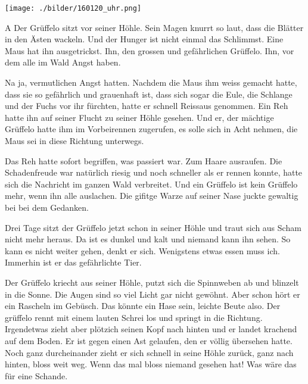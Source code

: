 \thispagestyle{empty}
\begin{center}
\texttt{[image: ./bilder/160120\_uhr.png]}
\end{center}
\vskip 2cm
{\Huge\color{farbe}\hfill{\tt{}}}
\newpage
\lettrine[lines=2, lhang=.2, loversize=.25, lraise=0.05, findent=0.1em,
nindent=0em]{A}{}
Der Grüffelo sitzt vor seiner Höhle. Sein Magen knurrt so laut, dass die Blätter in den Ästen wackeln. Und der Hunger ist nicht einmal das Schlimmst. Eine Maus hat ihn ausgetrickst. Ihn, den grossen und gefährlichen Grüffelo. Ihn, vor dem alle im Wald Angst haben. 

Na ja, vermutlichen Angst hatten. Nachdem die Maus ihm weiss gemacht hatte, dass sie so gefährlich und grauenhaft ist, dass sich sogar die Eule, die Schlange und der Fuchs vor ihr fürchten, hatte er schnell Reissaus genommen. Ein Reh hatte ihn auf seiner Flucht zu seiner Höhle gesehen. Und er, der mächtige Grüffelo hatte ihm im Vorbeirennen zugerufen, es solle sich in Acht nehmen, die Maus sei in diese Richtung unterwegs. 

Das Reh hatte sofort begriffen, was passiert war. Zum Haare ausraufen. Die Schadenfreude war natürlich riesig und noch schneller als er rennen konnte, hatte sich die Nachricht im ganzen Wald verbreitet. Und ein Grüffelo ist kein Grüffelo mehr, wenn ihn alle auslachen. Die gifitge Warze auf seiner Nase juckte gewaltig bei bei dem Gedanken. 

Drei Tage sitzt der Grüffelo jetzt schon in seiner Höhle und traut sich aus Scham nicht mehr heraus. Da ist es dunkel und kalt und niemand kann ihn sehen. So kann es nicht weiter gehen, denkt er sich. Wenigstens etwas essen muss ich. Immerhin ist er das gefährlichte Tier. 

Der Grüffelo kriecht aus seiner Höhle, putzt sich die Spinnweben ab und blinzelt in die Sonne. Die Augen sind so viel Licht gar nicht gewöhnt. Aber schon hört er ein Rascheln im Gebüsch. Das könnte ein Hase sein, leichte Beute also. Der grüffelo rennt mit einem lauten Schrei los und springt in die Richtung. Irgendetwas zieht aber plötzich seinen Kopf nach hinten und er landet krachend auf dem Boden. Er ist gegen einen Ast gelaufen, den er völlig übersehen hatte. Noch ganz durcheinander zieht er sich schnell in seine Höhle zurück, ganz nach hinten, bloss weit weg. Wenn das mal bloss niemand gesehen hat! Was wäre das für eine Schande.

